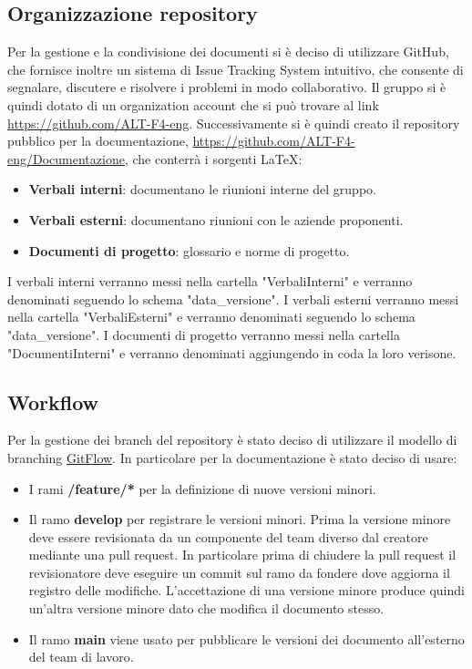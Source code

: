 \documentclass[a4paper, 12pt]{article}
\begin{document}
    \subsection{Organizzazione repository}
    Per la gestione e la condivisione dei documenti si è deciso di utilizzare GitHub, che fornisce inoltre un sistema di Issue Tracking System intuitivo, che consente di segnalare, discutere e risolvere i problemi in modo collaborativo.
    Il gruppo si è quindi dotato di un organization account che si può trovare al link \url{https://github.com/ALT-F4-eng}.
    Successivamente si è quindi creato il repository pubblico per la documentazione, \url{https://github.com/ALT-F4-eng/Documentazione}, che conterrà i sorgenti LaTeX:
    \begin{itemize}
        \item \textbf{Verbali interni}: documentano le riunioni interne del gruppo.
        \item \textbf{Verbali esterni}: documentano riunioni con le aziende proponenti.
        \item \textbf{Documenti di progetto}: glossario e norme di progetto.
    \end{itemize}
    I verbali interni verranno messi nella cartella "VerbaliInterni" e verranno denominati seguendo lo schema "data\_versione".
    I verbali esterni verranno messi nella cartella "VerbaliEsterni" e verranno denominati seguendo lo schema "data\_versione". 
    I documenti di progetto verranno messi nella cartella "DocumentiInterni" e verranno denominati aggiungendo in coda la loro verisone.
    
    \subsection{Workflow}
    Per la gestione dei branch del repository è stato deciso di utilizzare il modello di branching \href{https://www.atlassian.com/it/git/tutorials/comparing-workflows/gitflow-workflow}{GitFlow}.
    In particolare per la documentazione è stato deciso di usare:
    \begin{itemize}
        \item I rami \textbf{/feature/*} per la definizione di nuove versioni minori.
        \item Il ramo \textbf{develop} per registrare le versioni minori.
        Prima la versione minore deve essere revisionata da un componente del team diverso dal creatore mediante una pull request.
        In particolare prima di chiudere la pull request  il revisionatore deve eseguire un commit sul ramo da fondere dove aggiorna il registro delle modifiche.
        L’accettazione di una versione minore produce quindi un’altra versione minore dato che modifica il documento stesso.
        \item Il ramo \textbf{main} viene usato per pubblicare le versioni dei documento all’esterno del team di lavoro.
    \end{itemize}
\end{document}
